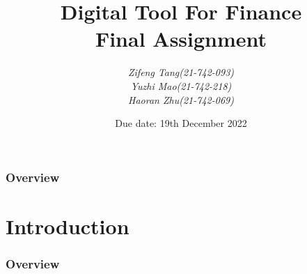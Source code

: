 \documentclass{beamer}
\title[]{\textbf{Digital Tool For Finance}\\ Final Assignment} %
\author{\textit{Zifeng Tang(21-742-093)} \\ \textit{Yuzhi Mao(21-742-218)} \\ \textit{Haoran Zhu(21-742-069)} }
\date{Due date: 19th December 2022}
\begin{document}
\begin{frame}
\titlepage %
\end{frame}

\begin{frame}
\frametitle{Overview} %
\tableofcontents %
\end{frame}


\section{Introduction} %
\begin{frame}
\frametitle{Overview} %
\tableofcontents[currentsection] %
\end{frame}
\end{document}
